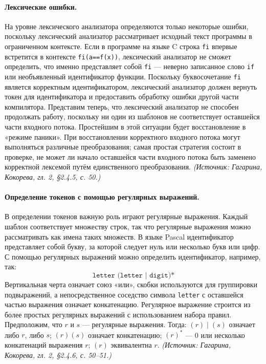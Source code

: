 \documentclass[a4paper,12pt]{article}
\begin{document}
\paragraph{Лексические ошибки.}
На уровне лексического анализатора определяются только некоторые ошибки, поскольку лексический анализатор рассматривает исходный текст программы в ограниченном контексте. Если в программе на языке C строка \texttt{fi} впервые встретится в контексте \texttt{fi(a==f(x))}, лексический анализатор не сможет определить, что именно представляет собой \texttt{fi} — неверно записанное слово \texttt{if} или необъявленный идентификатор функции. Поскольку буквосочетание \texttt{fi} является корректным идентификатором, лексический анализатор должен вернуть токен для идентификатора и предоставить обработку ошибки другой части компилятора. Представим теперь, что лексический анализатор не способен продолжать работу, поскольку ни один из шаблонов не соответствует оставшейся части входного потока. Простейшим в этой ситуации будет восстановление в «режиме паники». При восстановлении корректного входного потока могут выполняться различные преобразования; самая простая стратегия состоит в проверке, не может ли начало оставшейся части входного потока быть заменено корректной лексемой путём единственного преобразования.
\textit{(Источник: Гагарина, Кокорева, гл. 2, §2.4.5, с. 50.)}

\paragraph{Определение токенов с помощью регулярных выражений.}
В определении токенов важную роль играют регулярные выражения. Каждый шаблон соответствует множеству строк, так что регулярные выражения можно рассматривать как имена таких множеств. В языке Pascal идентификатор представляет собой букву, за которой следует нуль или несколько букв или цифр. С помощью регулярных выражений можно определить идентификатор, например, так:
\[
\texttt{letter (letter | digit)*}
\]
Вертикальная черта означает союз «или», скобки используются для группировки подвыражений, а непосредственное соседство символа \texttt{letter} с оставшейся частью выражения означает конкатенацию. Регулярное выражение строится из более простых регулярных выражений с использованием набора правил. Предположим, что \(r\) и \(s\) — регулярные выражения. Тогда: \((r)\mid(s)\) означает либо \(r\), либо \(s\); \((r)(s)\) означает конкатенацию; \((r)^*\) — 0 или несколько конкатенаций выражения \(r\); \((r)\) эквивалентна \(r\).
\textit{(Источник: Гагарина, Кокорева, гл. 2, §2.4.6, с. 50--51.)}
\end{document}
